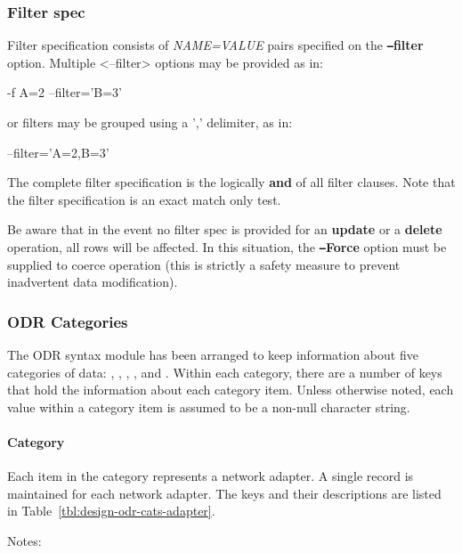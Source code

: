 \subsubsection*{Filter spec}%

Filter specification consists of {\em NAME=VALUE\/} pairs specified on the {\bf {\tt --}filter} option.
Multiple <--filter> options may be provided as in:

-f A=2 --filter='B=3'

or filters may be grouped using a ',' delimiter, as in:

--filter='A=2,B=3'

The complete filter specification is the logically {\bf and} of all filter clauses. Note
that the filter specification is an exact match only test.

Be aware that in the event no filter spec is provided for an {\bf update} or a {\bf delete}
operation, all rows will be affected. In this situation, the {\bf {\tt --}Force} option must
be supplied to coerce operation (this is strictly a safety measure to prevent
inadvertent data modification).

\subsubsection{ODR Categories}

The ODR syntax module has been arranged to keep information about five
categories of data: , ,
, , and 
. Within each category, there are a number of keys 
that hold the information about each category item. Unless otherwise
noted, each value within a category item is assumed to be a non-null
character string.


\paragraph{ Category}

Each item in the  category represents a network
adapter. A single record is maintained for each network adapter.  The
keys and their descriptions are listed in
Table~\ref{tbl:design-odr-cats-adapter}.

Notes:

